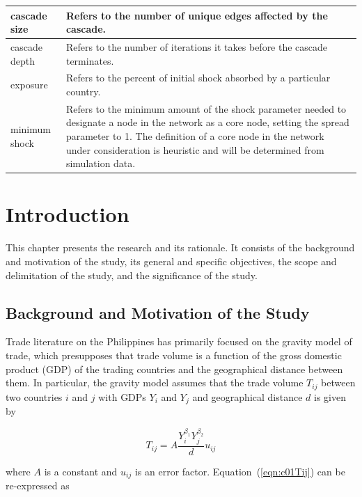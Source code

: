 \documentclass[12pt,letterpaper]{report}
\begin{document}
\begin{longtable}{|p{5cm}|p{8cm}|}
	\hline
	cascade size & Refers to the number of unique edges affected by the cascade. \\
	\hline
	cascade depth & Refers to the number of iterations it takes before the cascade terminates. \\
	\hline
	exposure & Refers to the percent of initial shock absorbed by a particular country.\\ 
	\hline
	minimum shock & Refers to the minimum amount of the shock parameter needed to designate a node in the network as a core node, setting the spread parameter to 1. The definition of a core node in the network under consideration is heuristic and will be determined from simulation data.\\ 
	\hline
\end{longtable}
\pagebreak


\chapter{Introduction}
\label{chap:1Intro}

This chapter presents the research and its rationale. It consists of the background and motivation of the study, its general and specific objectives, the scope and delimitation of the study, and the significance of the study.

\section{Background and Motivation of the Study}
\label{sec:11Background}
	 
	 Trade literature on the Philippines has primarily focused on the gravity model of trade, which presupposes that trade volume is a function of the gross domestic product (GDP) of the trading countries and the geographical distance between them. In particular, the gravity model assumes that the trade volume $T_{ij}$ between two countries $i$ and $j$ with GDPs $Y_i$ and $Y_j$  and geographical distance $d$ is given by
	 
\begin{equation}
\label{eqn:c01Tij} T_{ij} = A \frac{Y_i^{\beta_1}Y_j^{\beta_2}}{d} u_{ij}
\end{equation}
	 
\noindent where $A$ is a constant and $u_{ij}$ is an error factor. Equation~(\ref{eqn:c01Tij}) can be re-expressed as 
\end{document}
